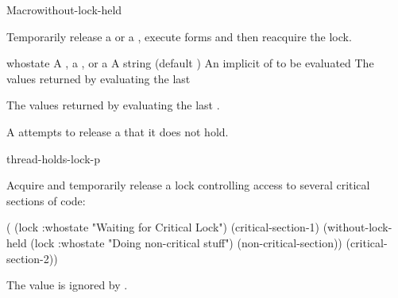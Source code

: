\documentclass[10pt,twoside,english,pdftex]{article}
\begin{document}
\begin{functiondoc}{Macro}{without-lock-held}{\code{(} 
    \code{)}
    \superstar{} 
    \returns{} \superstar}
%
%
%
%

\fnsyntax

\fnpurpose Temporarily release a  or a ,
execute forms and then reacquire the lock.

\fnpackage {}

\fnmodule {}

\fnargs
\begin{args}{whostate}
\arg[lock] A , a , or a 
\arg[whostate] A string (default )
\arg[forms] An implicit  of  to be evaluated
\arg[results] The values returned by evaluating the last 
\end{args}

\fnreturns The values returned by evaluating the last .

\fnerrors A  attempts to release a  that it does not
hold.
  
\begin{alsos}{thread-holds-lock-p}
\end{alsos}

\fnexample 
%
%
%
Acquire and temporarily release a lock controlling access to several
critical sections of code:
%
\W\supp
\begin{example}
  ( (lock :whostate "Waiting for Critical Lock")
    (critical-section-1)
    (without-lock-held (lock :whostate "Doing non-critical stuff")
      (non-critical-section))
    (critical-section-2))
\end{example}

\fnnote The  value is ignored by
.

\end{functiondoc}

\end{document}
